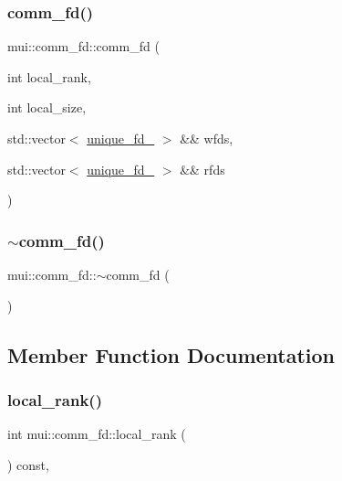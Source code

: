 \subsubsection{\texorpdfstring{comm\+\_\+fd()}{comm\_fd()}}
{\footnotesize\ttfamily mui\+::comm\+\_\+fd\+::comm\+\_\+fd (\begin{DoxyParamCaption}\item[{int}]{local\+\_\+rank,  }\item[{int}]{local\+\_\+size,  }\item[{std\+::vector$<$ \hyperlink{classmui_1_1unique__fd__}{unique\+\_\+fd\+\_\+} $>$ \&\&}]{wfds,  }\item[{std\+::vector$<$ \hyperlink{classmui_1_1unique__fd__}{unique\+\_\+fd\+\_\+} $>$ \&\&}]{rfds }\end{DoxyParamCaption})\hspace{0.3cm}{\ttfamily [inline]}}

\mbox{\label{classmui_1_1comm__fd_af584f7becf55e3df14581571ffc71100}} 
\subsubsection{\texorpdfstring{$\sim$comm\+\_\+fd()}{~comm\_fd()}}
{\footnotesize\ttfamily mui\+::comm\+\_\+fd\+::$\sim$comm\+\_\+fd (\begin{DoxyParamCaption}{ }\end{DoxyParamCaption})\hspace{0.3cm}{\ttfamily [inline]}}



\subsection{Member Function Documentation}
\mbox{\label{classmui_1_1comm__fd_ae149073567b5f9997fa3f4bd5fae0336}} 
\subsubsection{\texorpdfstring{local\+\_\+rank()}{local\_rank()}}
{\footnotesize\ttfamily int mui\+::comm\+\_\+fd\+::local\+\_\+rank (\begin{DoxyParamCaption}{ }\end{DoxyParamCaption}) const\hspace{0.3cm}{\ttfamily [inline]}, {\ttfamily [virtual]}}



